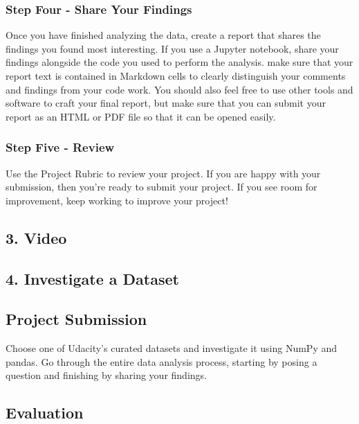 \documentclass[]{book}
\begin{document}
\subsubsection{Step Four - Share Your
Findings}\label{step-four---share-your-findings}

Once you have finished analyzing the data, create a report that shares
the findings you found most interesting. If you use a Jupyter notebook,
share your findings alongside the code you used to perform the analysis.
make sure that your report text is contained in Markdown cells to
clearly distinguish your comments and findings from your code work. You
should also feel free to use other tools and software to craft your
final report, but make sure that you can submit your report as an HTML
or PDF file so that it can be opened easily.

\subsubsection{Step Five - Review}\label{step-five---review}

Use the Project Rubric to review your project. If you are happy with
your submission, then you're ready to submit your project. If you see
room for improvement, keep working to improve your project!

\subsection{3. Video}\label{video}

\subsection{4. Investigate a Dataset}\label{investigate-a-dataset}

\subsection{Project Submission}\label{project-submission}

Choose one of Udacity's curated datasets and investigate it using NumPy
and pandas. Go through the entire data analysis process, starting by
posing a question and finishing by sharing your findings.

\subsection{Evaluation}\label{evaluation}
\end{document}
